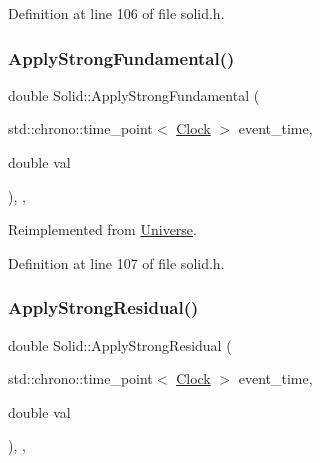 Definition at line 106 of file solid.\+h.

\mbox{\label{class_solid_abd8fff76385306f97aa65dfd6b867fc6}} 
\subsubsection{\texorpdfstring{Apply\+Strong\+Fundamental()}{ApplyStrongFundamental()}}
{\footnotesize\ttfamily double Solid\+::\+Apply\+Strong\+Fundamental (\begin{DoxyParamCaption}\item[{std\+::chrono\+::time\+\_\+point$<$ \mbox{\hyperlink{universe_8h_a0ef8d951d1ca5ab3cfaf7ab4c7a6fd80}{Clock}} $>$}]{event\+\_\+time,  }\item[{double}]{val }\end{DoxyParamCaption})\hspace{0.3cm}{\ttfamily [inline]}, {\ttfamily [final]}, {\ttfamily [virtual]}}



Reimplemented from \mbox{\hyperlink{class_universe_a62789bcff84bd750b0366004381e2fdd}{Universe}}.



Definition at line 107 of file solid.\+h.

\mbox{\label{class_solid_a07534fa79bb8a6eb32e081e5158ba9e5}} 
\subsubsection{\texorpdfstring{Apply\+Strong\+Residual()}{ApplyStrongResidual()}}
{\footnotesize\ttfamily double Solid\+::\+Apply\+Strong\+Residual (\begin{DoxyParamCaption}\item[{std\+::chrono\+::time\+\_\+point$<$ \mbox{\hyperlink{universe_8h_a0ef8d951d1ca5ab3cfaf7ab4c7a6fd80}{Clock}} $>$}]{event\+\_\+time,  }\item[{double}]{val }\end{DoxyParamCaption})\hspace{0.3cm}{\ttfamily [inline]}, {\ttfamily [final]}, {\ttfamily [virtual]}}




